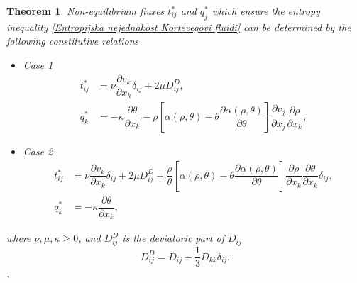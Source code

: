 \documentclass[a4paper,fleqn]{cas-sc}
\newtheorem{theorem}{Theorem}[section]
\theoremstyle{definition}
\begin{document}
\begin{theorem} \label{Te:Neravnotezni Protoci}
	Non-equilibrium fluxes $t_{ij}^{\ast}$ and $q_{j}^{\ast}$ which ensure the entropy inequality \eqref{Entropijska nejednakost Kortevegovi fluidi} can be determined by the following constitutive relations 
	\begin{itemize}
		\item Case 1
		\begin{align} \label{Konstitutivne relacije Kortevegovi fluidi-1}
			t_{ij}^{\ast} & = \nu \dfrac{\partial v_k}{\partial x_k} \delta_{ij} + 2 \mu D_{ij}^{D}, 
			\\ 
			q_{k}^{\ast} & = - \kappa \dfrac{\partial \theta}{\partial x_k} 
			- \rho \left[ \alpha(\rho, \theta) 
			- \theta \dfrac{\partial \alpha(\rho, \theta)}{\partial \theta}  \right] 
			\dfrac{\partial v_j}{\partial x_j} \dfrac{\partial \rho}{\partial x_k}, 
			\nonumber 
		\end{align}
		\item Case 2
		\begin{align} \label{Konstitutivne relacije Kortevegovi fluidi-2}
			t_{ij}^{\ast} & = \nu \dfrac{\partial v_k}{\partial x_k} \delta_{ij} + 2 \mu D_{ij}^{D} 
			+ \dfrac{\rho}{\theta} \left[ \alpha(\rho, \theta) 
			- \theta \dfrac{\partial \alpha(\rho, \theta)}{\partial \theta} \right] 
			\dfrac{\partial \rho}{\partial x_k} \dfrac{\partial \theta}{\partial x_k} \delta_{ij}, 
			\\ 
			q_{k}^{\ast} & = - \kappa \dfrac{\partial \theta}{\partial x_k}, 
			\nonumber 
		\end{align}
	\end{itemize}
	where $\nu, \mu, \kappa \geq 0$, and $D_{ij}^{D}$ is the deviatoric part of $D_{ij}$ 
	\begin{equation} \label{Dij deviatoric}
		D_{ij}^{D} = D_{ij} - \frac{1}{3} D_{kk} \delta_{ij}.
	\end{equation}. 
\end{theorem} 
\end{document}
